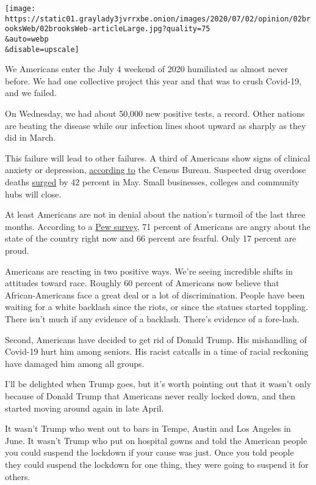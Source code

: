 \texttt{[image: https://static01.graylady3jvrrxbe.onion/images/2020/07/02/opinion/02brooksWeb/02brooksWeb-articleLarge.jpg?quality=75\\\&auto=webp\\\&disable=upscale]}

We Americans enter the July 4 weekend of 2020 humiliated as almost never
before. We had one collective project this year and that was to crush
Covid-19, and we failed.

On Wednesday, we had about 50,000 new positive tests, a record. Other
nations are beating the disease while our infection lines shoot upward
as sharply as they did in March.

This failure will lead to other failures. A third of Americans show
signs of clinical anxiety or depression,
\href{https://www.washingtonpost.com/health/2020/05/26/americans-with-depression-anxiety-pandemic/?arc404=true}{according
to} the Census Bureau. Suspected drug overdose deaths
\href{https://www.washingtonpost.com/health/2020/07/01/coronavirus-drug-overdose/}{surged}
by 42 percent in May. Small businesses, colleges and community hubs will
close.

At least Americans are not in denial about the nation's turmoil of the
last three months. According to a
\href{https://www.people-press.org/2020/06/30/publics-mood-turns-grim-trump-trails-biden-on-most-personal-traits-major-issues/}{Pew
survey}, 71 percent of Americans are angry about the state of the
country right now and 66 percent are fearful. Only 17 percent are proud.

Americans are reacting in two positive ways. We're seeing incredible
shifts in attitudes toward race. Roughly 60 percent of Americans now
believe that African-Americans face a great deal or a lot of
discrimination. People have been waiting for a white backlash since the
riots, or since the statues started toppling. There isn't much if any
evidence of a backlash. There's evidence of a fore-lash.

Second, Americans have decided to get rid of Donald Trump. His
mishandling of Covid-19 hurt him among seniors. His racist catcalls in a
time of racial reckoning have damaged him among all groups.

I'll be delighted when Trump goes, but it's worth pointing out that it
wasn't only because of Donald Trump that Americans never really locked
down, and then started moving around again in late April.

It wasn't Trump who went out to bars in Tempe, Austin and Los Angeles in
June. It wasn't Trump who put on hospital gowns and told the American
people you could suspend the lockdown if your cause was just. Once you
told people they could suspend the lockdown for one thing, they were
going to suspend it for others.

